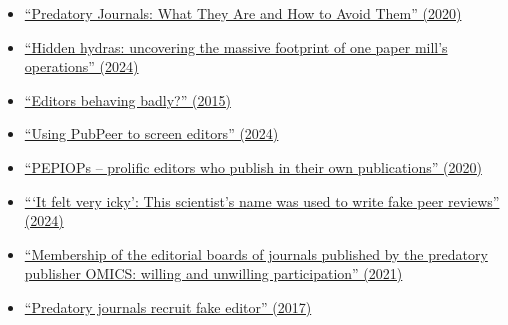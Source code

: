\documentclass[letterpaper, 12pt]{article}
\begin{document}
\begin{itemize}
    \setlength\itemsep{-0.5em}
    \item \href{https://doi.org/10.1177/0192623320920209}{``Predatory Journals: What They Are and How to Avoid Them'' (2020)}
    \item \href{https://retractionwatch.com/2024/10/01/hidden-hydras-uncovering-the-massive-footprint-of-one-paper-mills-operations/}{``Hidden hydras: uncovering the massive footprint of one paper mill’s operations'' (2024)}
    \item \href{https://deevybee.blogspot.com/2015/02/editors-behaving-badly.html}{``Editors behaving badly?'' (2015)}
    \item \href{https://deevybee.blogspot.com/2024/09/using-pubpeer-to-screen-editors.html}{``Using PubPeer to screen editors'' (2024)}
    \item \href{https://deevybee.blogspot.com/2020/08/pepiops-prolific-editors-who-publish-in.html}{``PEPIOPs – prolific editors who publish in their own publications'' (2020)}
    \item \href{https://www.science.org/content/article/it-felt-very-icky-scientist-s-name-was-used-write-fake-peer-reviews}{```It felt very icky': This scientist's name was used to write fake peer reviews'' (2024)}
    \item \href{https://doi.org/10.47989/irpaper912}{``Membership of the editorial boards of journals published by the predatory publisher OMICS: willing and unwilling participation'' (2021)}
    \item \href{https://doi.org/10.1038/543481a}{``Predatory journals recruit fake editor'' (2017)}
\end{itemize}
\end{document}
